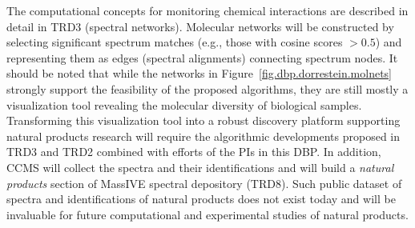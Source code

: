 \documentclass[arial,11pt]{article}
\begin{document}
The computational concepts for monitoring chemical interactions
are described in detail in TRD3 (spectral networks).
Molecular  networks will be  constructed by selecting significant spectrum matches (e.g., those with cosine scores $>0.5$) and representing them as edges (spectral alignments) connecting spectrum nodes.
It should be noted that while  the networks in Figure~\ref{fig.dbp.dorrestein.molnets} strongly support the feasibility of the proposed algorithms,
they are still mostly a visualization tool revealing the molecular diversity of biological samples.  Transforming this visualization tool into a robust discovery platform supporting natural products research will require the algorithmic developments proposed in TRD3 and TRD2 combined with efforts of the PIs in this DBP.  In addition, CCMS will collect the spectra and their identifications and will build a {\em natural products} section of MassIVE spectral depository (TRD8). Such public dataset of spectra and identifications of natural products  does not exist today and will be invaluable for future computational and experimental studies of natural products.

\end{document}
